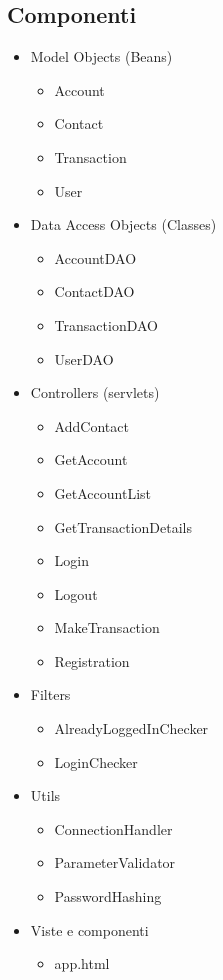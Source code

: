 \documentclass{article}
\begin{document}
\subsection{Componenti}
\begin{itemize}
	\item Model Objects (Beans)
	\begin{itemize}
		\item Account
		\item Contact
		\item Transaction
		\item User
	\end{itemize}
	\item Data Access Objects (Classes)
	\begin{itemize}
		\item AccountDAO
		\item ContactDAO
		\item TransactionDAO
		\item UserDAO
	\end{itemize}
	\item Controllers (servlets)
	\begin{itemize}
		\item AddContact
		\item GetAccount
		\item GetAccountList
		\item GetTransactionDetails
		\item Login
		\item Logout
		\item MakeTransaction
		\item Registration
	\end{itemize}
	\item Filters
	\begin{itemize}
		\item AlreadyLoggedInChecker
		\item LoginChecker
	\end{itemize}
	\item Utils
	\begin{itemize}
		\item ConnectionHandler
		\item ParameterValidator
		\item PasswordHashing
	\end{itemize}
	\item Viste e componenti
	\begin{itemize}
		\item app.html
		\begin{itemize}

\end{itemize}
\end{itemize}
\end{itemize}
\end{document}
